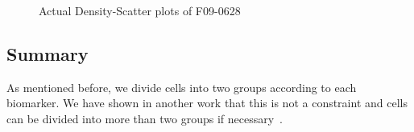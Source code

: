 \begin{figure}[!ht]
{  }
  \caption{Actual Density-Scatter plots of F09-0628}
  \label{fig:fcs-qa-density-scatter-DLBCL}
\end{figure}

\subsection{Summary}
As mentioned before, we divide cells into two groups according to each biomarker. We have shown in another work that this is not a constraint and cells can be divided into more than two groups if necessary~\cite{o2014enhanced}.

